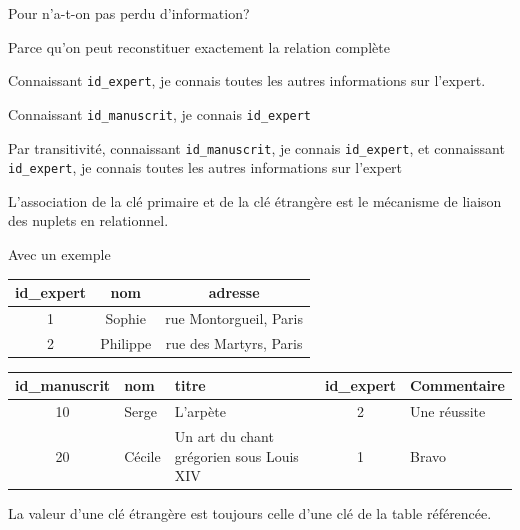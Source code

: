 \begin{frame}{Pour n'a-t-on pas perdu d'information?}
 
Parce qu'on peut reconstituer \alert{exactement} la relation complète
\vfill

    
\begin{redbullet}
  \item Connaissant \texttt{id\_expert}, je connais 
     toutes les autres informations sur l'expert.
 \item Connaissant \texttt{id\_manuscrit}, je connais \texttt{id\_expert}
     \item  Par \alert{transitivité}, connaissant \texttt{id\_manuscrit}, je  connais \texttt{id\_expert},
     et connaissant \texttt{id\_expert}, je connais toutes les autres informations sur l'expert
\end{redbullet}

\vfill


\begin{blocgauche}
L'association de la clé primaire et de la clé étrangère est le mécanisme
de liaison des nuplets en relationnel.
\end{blocgauche}

\end{frame}


\begin{frame}{Avec un exemple}
 
\begin{tabular}{c|c|c}
\textbf{id\_expert} & \textbf{nom} & \textbf{adresse}\\ \hline
   1 &Sophie &rue Montorgueil, Paris\\
   2& Philippe  &rue des Martyrs, Paris\\
\hline
\end{tabular}

\vfill

\begin{tabular}{c|l|p{4cm}|c|p{3cm}}
\textbf{id\_manuscrit} & \textbf{nom} & \textbf{titre} & \textbf{id\_expert}  & \textbf{Commentaire}\\ \hline
   10& Serge&  L'arpète &2& Une réussite\\
   20& Cécile& Un art du chant grégorien sous Louis XIV& 1& Bravo\\
\hline
\end{tabular}

\vfill

\begin{blocgauche}
La valeur d'une clé étrangère est \alert{toujours} celle
d'une clé de la table référencée.
\end{blocgauche}
\end{frame}


